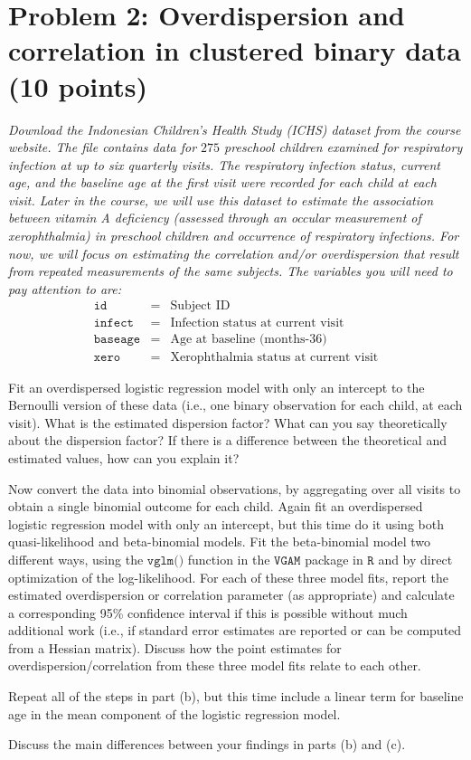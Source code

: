 \documentclass[11pt, letterpaper]{article}
\newcommand{\beas}{\begin{eqnarray*}}
\newcommand{\eeas}{\end{eqnarray*}}
\begin{document}
\section*{Problem 2: Overdispersion and correlation in clustered binary data (10 points)}
{\em Download the Indonesian Children's Health Study (ICHS) dataset from the course website.  
The file contains data for
$275$ preschool children examined for respiratory infection at up to six quarterly visits.  
The respiratory infection status, current age, and
the baseline age at the first visit were recorded for each child at each visit.
Later in the course, we will use this dataset to estimate
the association between vitamin A deficiency (assessed through an occular measurement of xerophthalmia)
in preschool children and occurrence of respiratory infections. 
For now, we will focus on estimating
the correlation and/or overdispersion that result from repeated measurements of the same subjects.
The variables you will need to pay attention to are:
\beas
\texttt{id}&=&\text{Subject ID}\\
\texttt{infect}&=&\text{Infection status at current visit}\\
\texttt{baseage}&=&\text{Age at baseline (months-36)}\\
\texttt{xero}&=&\text{Xerophthalmia status at current visit}
\eeas}
\begin{enumerate}[(a)]
{\em \item Fit an overdispersed logistic regression model with only an intercept to the Bernoulli version of these data (i.e., one binary observation for each child, at each visit).  What is the estimated dispersion factor?  What can you say theoretically about the dispersion factor?  If there is a difference between the theoretical
and estimated values, how can you explain it?}
{\em \item Now convert the data into binomial observations, by aggregating over all visits to obtain a single
binomial outcome for each child.  Again fit an overdispersed logistic regression model with only an intercept, but this time do it using both quasi-likelihood and beta-binomial models.  Fit the beta-binomial model two 
different ways,
using the $\texttt{vglm()}$ function in the $\texttt{VGAM}$ package in $\texttt{R}$
and by direct optimization of the log-likelihood.  For each
of these three model fits, report the estimated overdispersion or correlation parameter (as appropriate) and
calculate a corresponding 95\% confidence interval if this is possible without much additional work (i.e., if standard error
estimates are reported or can be computed from a Hessian matrix).  Discuss how the point estimates for overdispersion/correlation from these three model fits relate to each other.}
{\em \item Repeat all of the steps in part (b), but this time include a linear term for baseline age 
in the mean component of the logistic regression model.}
{\em \item Discuss the main differences between your findings in parts (b) and (c).}
\end{enumerate}
\end{document}
